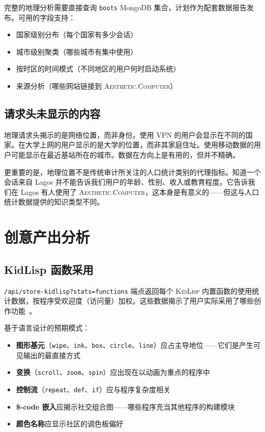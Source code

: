 \documentclass[10pt,letterpaper,twocolumn]{article}
\newcommand{\ac}{\textsc{Aesthetic.Computer}}
\newcommand{\kl}{\textsc{KidLisp}}
\begin{document}
完整的地理分析需要直接查询 \texttt{boots} MongoDB 集合，计划作为配套数据报告发布。可用的字段支持：

\begin{itemize}
  \item 国家级别分布（每个国家有多少会话）
  \item 城市级别聚类（哪些城市有集中使用）
  \item 按时区的时间模式（不同地区的用户何时启动系统）
  \item 来源分析（哪些网站链接到 \ac{}）
\end{itemize}

\subsection{请求头未显示的内容}

地理请求头揭示的是网络位置，而非身份。使用 VPN 的用户会显示在不同的国家。在大学上网的用户显示的是大学的位置，而非其家庭住址。使用移动数据的用户可能显示在最近基站所在的城市。数据在方向上是有用的，但并不精确。

更重要的是，地理位置不是传统审计所关注的人口统计类别的代理指标。知道一个会话来自 Lagos 并不能告诉我们用户的年龄、性别、收入或教育程度。它告诉我们在 Lagos 有人使用了 \ac{}，这本身是有意义的——但这与人口统计数据提供的知识类型不同。

\section{创意产出分析}

\subsection{KidLisp 函数采用}

\texttt{/api/store-kidlisp?stats=functions} 端点返回每个 \kl{} 内置函数的使用统计数据，按程序受欢迎度（访问量）加权。这些数据揭示了用户实际采用了哪些创作功能~\citep{scudder2026kidlisp}。

基于语言设计的预期模式：
\begin{itemize}
  \item \textbf{图形基元}（\texttt{wipe}、\texttt{ink}、\texttt{box}、\texttt{circle}、\texttt{line}）应占主导地位——它们是产生可见输出的最直接方式
  \item \textbf{变换}（\texttt{scroll}、\texttt{zoom}、\texttt{spin}）应出现在以动画为重点的程序中
  \item \textbf{控制流}（\texttt{repeat}、\texttt{def}、\texttt{if}）应与程序复杂度相关
  \item \textbf{\$-code 嵌入}应揭示社交组合图——哪些程序充当其他程序的构建模块
  \item \textbf{颜色名称}应显示社区的调色板偏好
\end{itemize}
\end{document}
